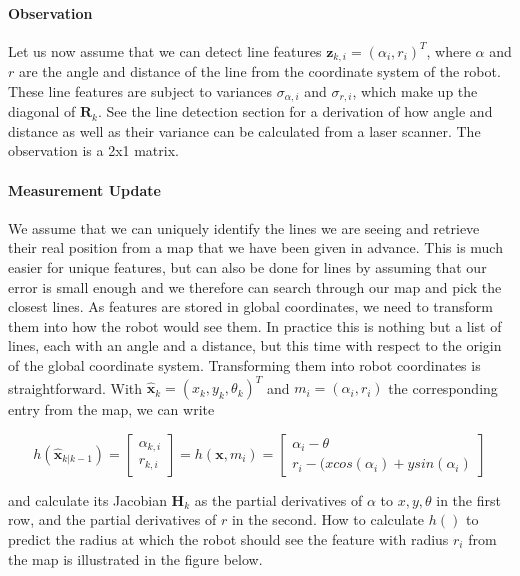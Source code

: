 \paragraph{Observation}
Let us now assume that we can detect line features $ \boldsymbol{z}_{k,i}=(\alpha_i,r_i)^T$, where $ \alpha$ and $ r$ are the angle and distance of the line from the coordinate system of the robot. These line features are subject to variances $ \sigma_{\alpha,i}$ and $ \sigma_{r,i}$, which make up the diagonal of $ \boldsymbol{R}_{k}$. See the line detection section for a derivation of how angle and distance as well as their variance can be calculated from a laser scanner. The observation is a 2x1 matrix.

\paragraph{Measurement Update}
We assume that we can uniquely identify the lines we are seeing and retrieve their real position from a map that we have been given in advance. This is much easier for unique features, but can also be done for lines by assuming that our error is small enough and we therefore can search through our map and pick the closest lines. As features are stored in global coordinates, we need to transform them into how the robot would see them. In practice this is nothing but a list of lines, each with an angle and a distance, but this time with respect to the origin of the global coordinate system. Transforming them into robot coordinates is straightforward. With  $ \hat{\boldsymbol{x}}_{k}=(x_{k},y_{k},\theta_k)^T$ and $ m_i=(\alpha_i,r_i)$ the corresponding entry from the map, we can write

\begin{equation} h(\hat{\boldsymbol{x}}_{k|k-1})=\left[\begin{array}{c}\alpha_{k,i}\\r_{k,i}\end{array}\right]=h(\boldsymbol{x},m_i)=\left[\begin{array}{c}\alpha_i-\theta\\r_i-(x cos(\alpha_i)+y sin(\alpha_i)\end{array}\right]
\end{equation}

and calculate its Jacobian $ \boldsymbol{H}_{k}$ as the partial derivatives of $ \alpha$ to $ x,y,\theta$ in the first row, and the partial derivatives of $ r$ in the second. How to calculate $ h()$ to predict the radius at which the robot should see the feature with radius $ r_i$ from the map is illustrated in the figure below.


